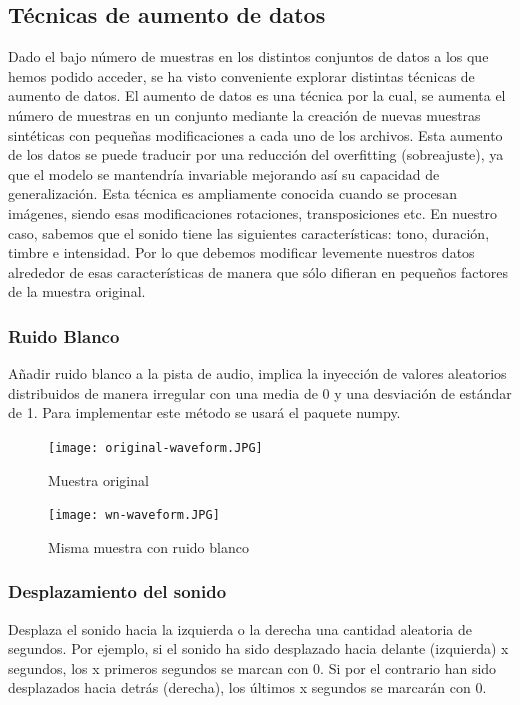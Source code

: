 \documentclass[11pt,a4paper,spanish]{book}
\begin{document}
	\subsection{Técnicas de aumento de datos}
	Dado el bajo número de muestras en los distintos conjuntos de datos a los que hemos podido acceder, se ha visto conveniente explorar distintas técnicas de aumento de datos. El aumento de datos es una técnica por la cual, se aumenta el número de muestras en un conjunto mediante la creación de nuevas muestras sintéticas con pequeñas modificaciones a cada uno de los archivos. Esta aumento de los datos se puede traducir por una reducción del overfitting (sobreajuste), ya que el modelo se mantendría invariable mejorando así su capacidad de generalización.
	Esta técnica es ampliamente conocida cuando se procesan imágenes, siendo esas modificaciones rotaciones, transposiciones etc. En nuestro caso, sabemos que el sonido tiene las siguientes características: tono, duración, timbre e intensidad. Por lo que debemos modificar levemente nuestros datos alrededor de esas características de manera que sólo difieran en pequeños factores de la muestra original.
	
		\subsubsection{Ruido Blanco}
		Añadir ruido blanco a la pista de audio, implica la inyección de valores aleatorios distribuidos de manera irregular con una media de 0 y una desviación de estándar de 1. Para implementar este método se usará el paquete numpy.
		
		\begin{figure}[!htb]
			\begin{minipage}{0.45\textwidth}
				\centering
				\texttt{[image: original-waveform.JPG]}
				\caption{Muestra original}
				\label{ref:audio_original_1}
			\end{minipage}\hfill 
			\begin{minipage}{0.45\textwidth}
				\centering
				\texttt{[image: wn-waveform.JPG]}\hfill
				\caption{Misma muestra con ruido blanco}
				\label{ref:audio_wn}
			\end{minipage}
		\end{figure}
				
				
		\subsubsection{Desplazamiento del sonido}
		Desplaza el sonido hacia la izquierda o la derecha una cantidad aleatoria de segundos. Por ejemplo, si el sonido ha sido desplazado hacia delante (izquierda) x segundos, los x primeros segundos se marcan con 0. Si por el contrario han sido desplazados hacia detrás (derecha), los últimos x segundos se marcarán con 0.
		
\end{document}
